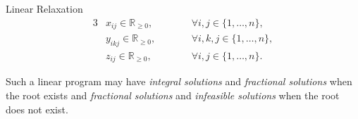 \documentclass[10pt]{beamer}
\begin{document}
\begin{frame}{Linear Relaxation}
    \begin{alignat}{3}
        & x_{ij} \in  \mathbb{R}_{\geq 0}, 
        &&\qquad \forall i,j \in \{1, \dots, n\}, \label{eq::LP_x_variable} \\
        & y_{ikj} \in \mathbb{R}_{\geq 0}, 
        &&\qquad \forall i,k,j \in \{1, \dots, n\}, \label{eq::LP_y_variable} \\
        & z_{ij} \in \mathbb{R}_{\geq 0}, 
        &&\qquad \forall i,j \in \{1, \dots, n\} \label{eq::LP_z_variable}. 
    \end{alignat} 

    Such a linear program may have \emph{integral solutions} and \emph{fractional solutions} when the root exists and \emph{fractional solutions} and \emph{infeasible solutions} when the root does not exist. 
\end{frame}
\end{document}
